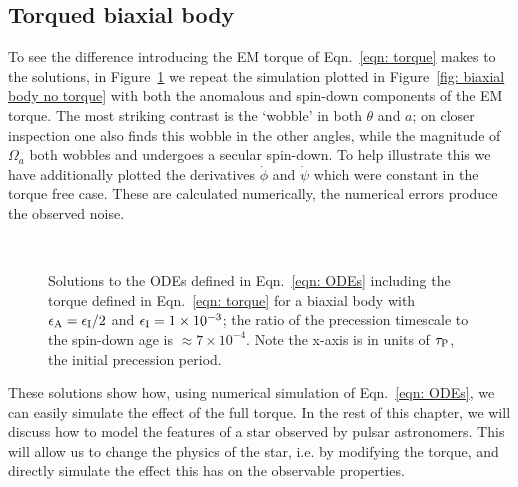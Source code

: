 \documentclass[../full_thesis/full_thesis.tex]{subfiles}
\begin{document}
\subsection{Torqued biaxial body}
\label{sec: biaxial body with torque}
To see the difference introducing the EM torque of Eqn.~\eqref{eqn: torque}  makes to the
solutions, in Figure~\ref{fig: biaxial body with torque} we repeat the simulation
plotted in Figure~\ref{fig: biaxial body no torque} with both the anomalous
and spin-down components of the EM torque. The most
striking contrast is the `wobble' in both $\theta$ and $a$; on closer
inspection one also finds this wobble in the other angles, while the magnitude of
$\Omega_a$ both wobbles and undergoes a secular spin-down. To help illustrate
this we have additionally plotted the derivatives $\dot{\phi}$ and $\dot{\psi}$
which were constant in the torque free case. These are calculated numerically,
the numerical errors produce the observed noise.
\afterpage{\clearpage}
\begin{figure}[p]
    \centering
{} \\
\caption{Solutions to the ODEs defined in Eqn.~\eqref{eqn: ODEs} including the
torque defined in Eqn.~\eqref{eqn: torque} for a biaxial body with
$\epsilon_{\mathrm{A}}=\epsilon_{\mathrm{I}}/2$ and $\epsilon_{\mathrm{I}}=1\times10^{-3}$; the ratio of the precession timescale
to the spin-down age is $\approx 7\times10^{-4}$. Note the x-axis is in units of
$\tau_{\mathrm{P}}$, the initial precession period.}
\label{fig: biaxial body with torque}
\end{figure}

These solutions show how, using numerical simulation of Eqn.~\eqref{eqn: ODEs},
we can easily simulate the effect of the full \citet{Deutsch1955} torque. In the rest
of this chapter, we will discuss how to model the features of a star observed
by pulsar astronomers. This will allow us to change the physics of the star,
i.e. by modifying the torque, and directly simulate the effect this has on
the observable properties.
\end{document}
